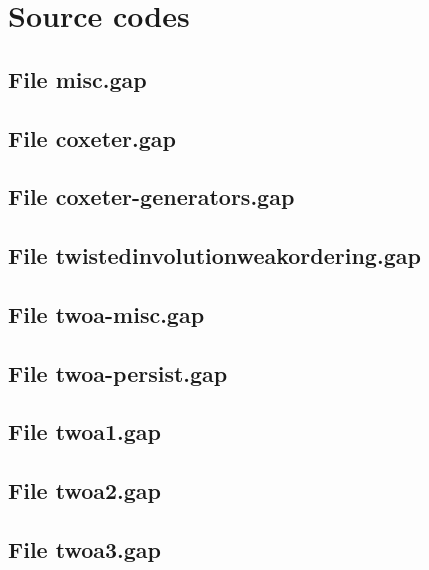 \chapter{Source codes}
\label{sec:sourcecodes}

\section*{File misc.gap}
\label{file:misc}


\section*{File coxeter.gap}
\label{file:coxeter}


\section*{File coxeter-generators.gap}
\label{file:coxeter-generators}


\section*{File twistedinvolutionweakordering.gap}
\label{file:twistedinvolutionweakordering}


\section*{File twoa-misc.gap}
\label{file:twoa-misc}


\section*{File twoa-persist.gap}
\label{file:twoa-persist}


\section*{File twoa1.gap}
\label{file:twoa1}


\section*{File twoa2.gap}
\label{file:twoa2}


\section*{File twoa3.gap}
\label{file:twoa3}
